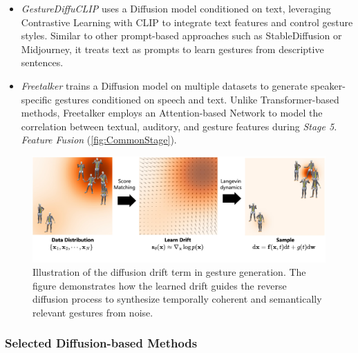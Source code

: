 \begin{itemize}
	\item \textit{GestureDiffuCLIP} \cite{ao2023gesturediffuclip} uses a Diffusion model conditioned on text, leveraging Contrastive Learning with CLIP to integrate text features and control gesture styles. Similar to other prompt-based approaches such as StableDiffusion or Midjourney, it treats text as prompts to learn gestures from descriptive sentences.
	
	\item \textit{Freetalker} \cite{yang2024freetalker} trains a Diffusion model on multiple datasets to generate speaker-specific gestures conditioned on speech and text. Unlike Transformer-based methods, Freetalker employs an Attention-based Network to model the correlation between textual, auditory, and gesture features during \textit{Stage 5. Feature Fusion} (\autoref{fig:CommonStage}).
\end{itemize}

\begin{figure}[htbp]
	\centering
	\includegraphics[width=\linewidth]{figures/ScoreMatching.jpg}
	\caption{Illustration of the diffusion drift term in gesture generation. The figure demonstrates how the learned drift guides the reverse diffusion process to synthesize temporally coherent and semantically relevant gestures from noise.}
	\label{fig:ScoreMatching}
\end{figure}

\vspace{-0.2cm}
\subsubsection{Selected Diffusion-based Methods}



